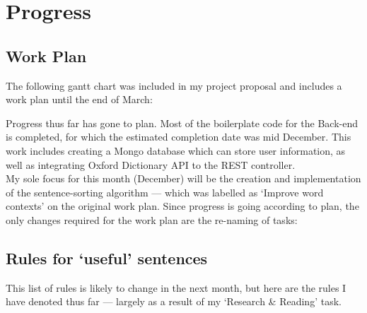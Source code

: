 \section{Progress}
\subsection{Work Plan}

The following gantt chart was included in my project proposal and includes a work plan until the end of March: 
\newline
\newline
\noindent
{}
\newline

Progress thus far has gone to plan. Most of the boilerplate code for the Back-end is completed, for which the estimated completion date was mid December. This work includes creating a Mongo database which can store user information, as well as integrating Oxford Dictionary API to the REST controller. \\

My sole focus for this month (December) will be the creation and implementation of the sentence-sorting algorithm --- which was labelled as `Improve word contexts' on the original work plan. Since progress is going according to plan, the only changes required for the work plan are the re-naming of tasks: \\

\noindent
{}
\newline

\subsection{Rules for `useful' sentences}

This list of rules is likely to change in the next month, but here are the rules I have denoted thus far --- largely as a result of my `Research \& Reading' task. 

